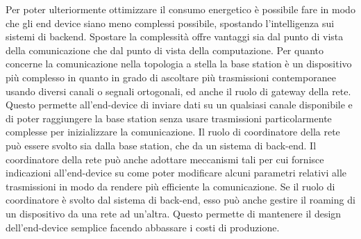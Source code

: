 \documentclass[12pt,a4paper,openright,twoside]{report}
\begin{document}
Per poter ulteriormente ottimizzare il consumo energetico \`e possibile fare in modo che gli end device siano meno complessi possibile, spostando l'intelligenza sui sistemi di backend. Spostare la complessit\`a offre vantaggi sia dal punto di vista della comunicazione che dal punto di vista della computazione.
Per quanto concerne la comunicazione nella topologia a stella la base station \`e un dispositivo pi\`u complesso in quanto in grado di ascoltare pi\`u trasmissioni contemporanee usando diversi canali o segnali ortogonali, ed anche il ruolo di gateway della rete. 
Questo permette all'end-device di inviare dati su un qualsiasi canale disponibile e di poter raggiungere la base station senza usare trasmissioni particolarmente complesse per inizializzare la comunicazione. 
Il ruolo di coordinatore della rete pu\`o essere svolto sia dalla base station, che da un sistema di back-end.
Il coordinatore della rete pu\`o anche adottare meccanismi tali per cui fornisce indicazioni all'end-device su come poter modificare alcuni parametri relativi alle trasmissioni in modo da rendere pi\`u efficiente la comunicazione. 
Se il ruolo di coordinatore \`e svolto dal sistema di back-end, esso pu\`o anche gestire il roaming di un dispositivo da una rete ad un'altra. 
Questo permette di mantenere il design dell'end-device semplice facendo abbassare i costi di produzione.
\end{document}
